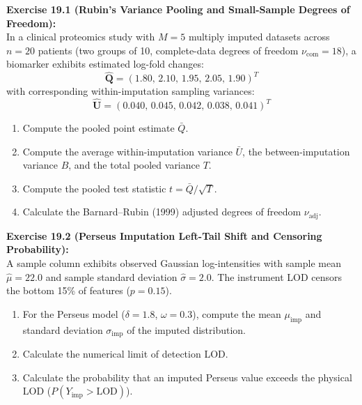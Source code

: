 \documentclass[11pt,oneside]{book}
\begin{document}
\noindent
\textbf{Exercise 19.1 (Rubin's Variance Pooling and Small-Sample Degrees of Freedom):}\\
In a clinical proteomics study with $M = 5$ multiply imputed datasets across $n = 20$ patients (two groups of 10, complete-data degrees of freedom $\nu_{\text{com}} = 18$), a biomarker exhibits estimated log-fold changes:
$$\hat{\mathbf{Q}} = (1.80,\, 2.10,\, 1.95,\, 2.05,\, 1.90)^T$$
with corresponding within-imputation sampling variances:
$$\hat{\mathbf{U}} = (0.040,\, 0.045,\, 0.042,\, 0.038,\, 0.041)^T$$
\begin{enumerate}
    \item Compute the pooled point estimate $\bar{Q}$.
    \item Compute the average within-imputation variance $\bar{U}$, the between-imputation variance $B$, and the total pooled variance $T$.
    \item Compute the pooled test statistic $t = \bar{Q} / \sqrt{T}$.
    \item Calculate the Barnard--Rubin (1999) adjusted degrees of freedom $\nu_{\text{adj}}$.
\end{enumerate}

\vspace{0.8em}
\noindent
\textbf{Exercise 19.2 (Perseus Imputation Left-Tail Shift and Censoring Probability):}\\
A sample column exhibits observed Gaussian log-intensities with sample mean $\hat{\mu} = 22.0$ and sample standard deviation $\hat{\sigma} = 2.0$. The instrument LOD censors the bottom 15\% of features ($p = 0.15$). 
\begin{enumerate}
    \item For the Perseus model ($\delta = 1.8$, $\omega = 0.3$), compute the mean $\mu_{\text{imp}}$ and standard deviation $\sigma_{\text{imp}}$ of the imputed distribution.
    \item Calculate the numerical limit of detection LOD.
    \item Calculate the probability that an imputed Perseus value exceeds the physical LOD ($P(Y_{\text{imp}} > \text{LOD})$).
\end{enumerate}
\end{document}
